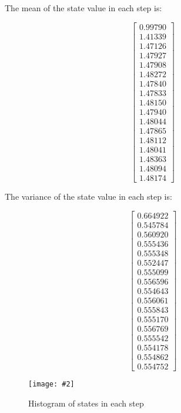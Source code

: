 \documentclass{article}
\newcommand{\centerfigcap}[3]{\begin{figure}[H]
\begin{center}\texttt{[image: \#2]} \caption{#3}\end{center}
\end{figure}}
\begin{document}
The mean of the state value in each step is:

\[
\begin{bmatrix}
0.99790\\
1.41339\\
1.47126\\
1.47927\\
1.47908\\
1.48272\\
1.47840\\
1.47833\\
1.48150\\
1.47940\\
1.48044\\
1.47865\\
1.48112\\
1.48041\\
1.48363\\
1.48094\\
1.48174
\end{bmatrix}
\]

\pagebreak
The variance of the state value in each step is:

\[
\begin{bmatrix}
0.664922\\
0.545784\\
0.560920\\
0.555436\\
0.555348\\
0.552447\\
0.555099\\
0.556596\\
0.554643\\
0.556061\\
0.555843\\
0.555170\\
0.556769\\
0.555542\\
0.554178\\
0.554862\\
0.554752
\end{bmatrix}
\]
\centerfigcap{1}{../Results/fig4}{Histogram of states in each step}
\end{document}
